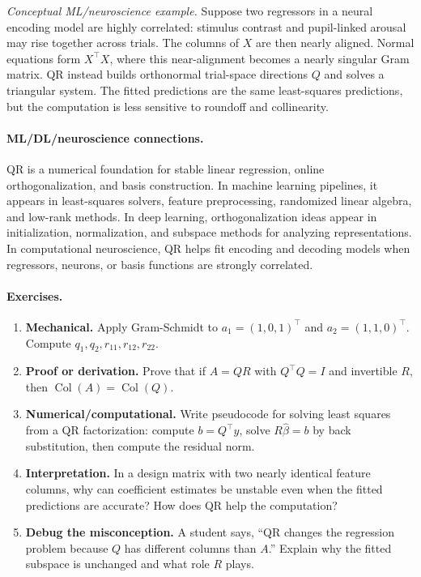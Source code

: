 \emph{Conceptual ML/neuroscience example.} Suppose two regressors in a neural encoding model are highly correlated: stimulus contrast and pupil-linked arousal may rise together across trials. The columns of \(X\) are then nearly aligned. Normal equations form \(X^\top X\), where this near-alignment becomes a nearly singular Gram matrix. QR instead builds orthonormal trial-space directions \(Q\) and solves a triangular system. The fitted predictions are the same least-squares predictions, but the computation is less sensitive to roundoff and collinearity.

\paragraph{ML/DL/neuroscience connections.}
QR is a numerical foundation for stable linear regression, online orthogonalization, and basis construction. In machine learning pipelines, it appears in least-squares solvers, feature preprocessing, randomized linear algebra, and low-rank methods. In deep learning, orthogonalization ideas appear in initialization, normalization, and subspace methods for analyzing representations. In computational neuroscience, QR helps fit encoding and decoding models when regressors, neurons, or basis functions are strongly correlated.

\paragraph{Exercises.}
\begin{enumerate}[label=\textbf{5.4.\arabic*.}, leftmargin=*]
\item \textbf{Mechanical.} Apply Gram-Schmidt to \(a_1=(1,0,1)^\top\) and \(a_2=(1,1,0)^\top\). Compute \(q_1,q_2,r_{11},r_{12},r_{22}\).
\item \textbf{Proof or derivation.} Prove that if \(A=QR\) with \(Q^\top Q=I\) and invertible \(R\), then \(\operatorname{Col}(A)=\operatorname{Col}(Q)\).
\item \textbf{Numerical/computational.} Write pseudocode for solving least squares from a QR factorization: compute \(b=Q^\top y\), solve \(R\hat\beta=b\) by back substitution, then compute the residual norm.
\item \textbf{Interpretation.} In a design matrix with two nearly identical feature columns, why can coefficient estimates be unstable even when the fitted predictions are accurate? How does QR help the computation?
\item \textbf{Debug the misconception.} A student says, ``QR changes the regression problem because \(Q\) has different columns than \(A\).'' Explain why the fitted subspace is unchanged and what role \(R\) plays.
\end{enumerate}

